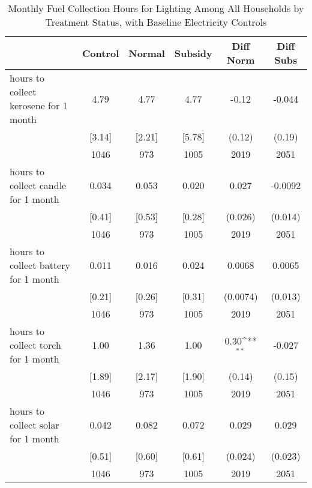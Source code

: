 \begin{table}[htbp]\centering
\def\sym#1{\ifmmode^{#1}\else\(^{#1}\)\fi}
\caption{Monthly Fuel Collection Hours for Lighting Among All Households by Treatment Status, with Baseline Electricity Controls \label{tab:"balance"}}
\begin{tabular*}{0.9\hsize}{@{\hskip\tabcolsep\extracolsep\fill}l*{1}{ccccc}}
\toprule
                                &  Control&   Normal&  Subsidy&Diff Norm         &Diff Subs         \\
\midrule
hours to collect kerosene for 1 month&     4.79&     4.77&     4.77&    -0.12         &   -0.044         \\
                                &   [3.14]&   [2.21]&   [5.78]&   (0.12)         &   (0.19)         \\
                                &     1046&      973&     1005&     2019         &     2051         \\
hours to collect candle for 1 month&    0.034&    0.053&    0.020&    0.027         &  -0.0092         \\
                                &   [0.41]&   [0.53]&   [0.28]&  (0.026)         &  (0.014)         \\
                                &     1046&      973&     1005&     2019         &     2051         \\
hours to collect battery for 1 month&    0.011&    0.016&    0.024&   0.0068         &   0.0065         \\
                                &   [0.21]&   [0.26]&   [0.31]& (0.0074)         &  (0.013)         \\
                                &     1046&      973&     1005&     2019         &     2051         \\
hours to collect torch for 1 month&     1.00&     1.36&     1.00&     0.30\sym{**} &   -0.027         \\
                                &   [1.89]&   [2.17]&   [1.90]&   (0.14)         &   (0.15)         \\
                                &     1046&      973&     1005&     2019         &     2051         \\
hours to collect solar for 1 month&    0.042&    0.082&    0.072&    0.029         &    0.029         \\
                                &   [0.51]&   [0.60]&   [0.61]&  (0.024)         &  (0.023)         \\
                                &     1046&      973&     1005&     2019         &     2051         \\

\end{tabular*}
\end{table}
